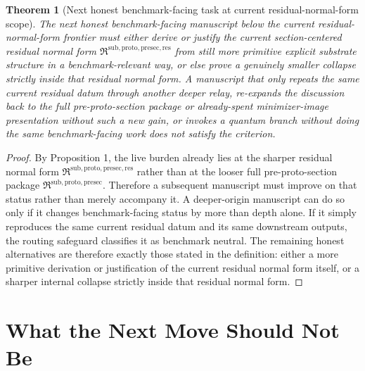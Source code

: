 \documentclass[11pt]{article}
\newcommand{\PreProtoSectionPackage}{\mathfrak R^{\mathrm{sub,proto,presec}}}
\newcommand{\PreProtoSectionResidualPackage}{\mathfrak R^{\mathrm{sub,proto,presec,res}}}
\newtheorem{theorem}{Theorem}
\begin{document}
\begin{theorem}[Next honest benchmark-facing task at current residual-normal-form scope]
The next honest benchmark-facing manuscript below the current residual-normal-form frontier must either derive or justify the current section-centered residual normal form \(\PreProtoSectionResidualPackage\) from still more primitive explicit substrate structure in a benchmark-relevant way, or else prove a genuinely smaller collapse strictly inside that residual normal form. A manuscript that only repeats the same current residual datum through another deeper relay, re-expands the discussion back to the full pre-proto-section package or already-spent minimizer-image presentation without such a new gain, or invokes a quantum branch without doing the same benchmark-facing work does not satisfy the criterion.
\end{theorem}

\begin{proof}
By Proposition 1, the live burden already lies at the sharper residual normal form \(\PreProtoSectionResidualPackage\) rather than at the looser full pre-proto-section package \(\PreProtoSectionPackage\). Therefore a subsequent manuscript must improve on that status rather than merely accompany it. A deeper-origin manuscript can do so only if it changes benchmark-facing status by more than depth alone. If it simply reproduces the same current residual datum and its same downstream outputs, the routing safeguard classifies it as benchmark neutral. The remaining honest alternatives are therefore exactly those stated in the definition: either a more primitive derivation or justification of the current residual normal form itself, or a sharper internal collapse strictly inside that residual normal form.
\end{proof}

\section{What the Next Move Should Not Be}
\end{document}
